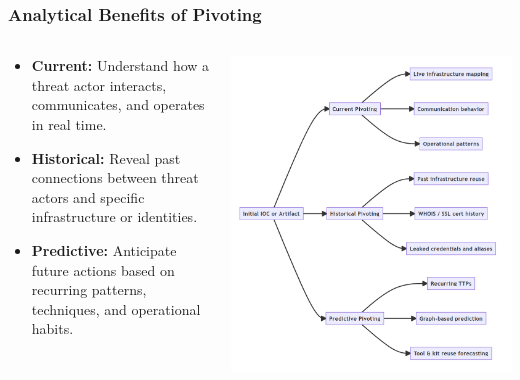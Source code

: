 \documentclass[10pt,aspectratio=169, colorlinks=true, linkcolor=circlBlue]{beamer}
\begin{document}
\begin{frame}
    \frametitle{Analytical Benefits of Pivoting}
    \begin{columns}
        \begin{column}{0.5\textwidth}
            \begin{itemize}
                \item {\bf Current:} Understand how a threat actor interacts, communicates, and operates in real time.
                \item {\bf Historical:} Reveal past connections between threat actors and specific infrastructure or identities.
                \item {\bf Predictive:} Anticipate future actions based on recurring patterns, techniques, and operational habits.
            \end{itemize}
        \end{column}
        \begin{column}{0.5\textwidth}
            \centering
            \includegraphics[scale=0.19]{img/pivot-overview.png}
        \end{column}
    \end{columns}
\end{frame}
\end{document}
